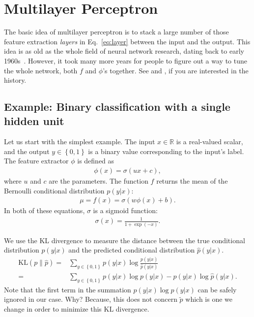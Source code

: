 \documentclass{report}
\newcommand{\RR}[0]{\mathbb{R}}
\newcommand{\KL}{\text{KL}}
\begin{document}
\section{Multilayer Perceptron}
\label{sec:mlp}

The basic idea of multilayer perceptron is to stack a large number of those
feature extraction {\em layers} in Eq.~\eqref{eq:layer} between the input and
the output. This idea is as old as the whole field of neural network research,
dating back to early 1960s~\cite{Rosenblatt1962}. However, it took many more
years for people to figure out a way to tune the whole network, both $f$ and
$\phi$'s together. See \cite{schmidhuber2015deep} and \cite{lecun2015deep}, if you
are interested in the history.

\subsection{Example: Binary classification with a single hidden unit}

Let us start with the simplest example. The input $x \in \RR$ is a real-valued
scalar, and the output $y \in \left\{0,1\right\}$ is a binary value
corresponding to the input's label. The feature extractor $\phi$ is defined as
\begin{align}
    \label{eq:phi}
    \phi(x) = \sigma(u x + c),
\end{align}
where $u$ and $c$ are the parameters. The function $f$ returns the mean of the
Bernoulli conditional distribution $p(y|x)$:
\begin{align}
    \label{eq:f}
    \mu = f(x) = \sigma(w \phi(x) + b).
\end{align}
In both of these equations, $\sigma$ is a sigmoid function:
\begin{align}
    \label{eq:sigmoid}
    \sigma(x) = \frac{1}{1+\exp(-x)}.
\end{align}

We use the KL divergence to measure the distance between the true conditional
distribution $p(y|x)$ and the predicted conditional distribution $\hat{p}(y|x)$.
\begin{align*}
    \KL(p\|\hat{p}) =& \sum_{y \in \left\{0, 1\right\}} p(y|x) \log
    \frac{p(y|x)}{\hat{p}(y|x)} \\
    =& \sum_{y \in \left\{0, 1\right\}} p(y|x) \log p(y|x) - p(y|x) \log
    {\hat{p}(y|x)}.
\end{align*}
Note that the first term in the summation $p(y|x) \log p(y|x)$ can be safely
ignored in our case. Why? Because, this does not concern $\tilde{p}$ which is
one we change in order to minimize this KL divergence.
\end{document}
